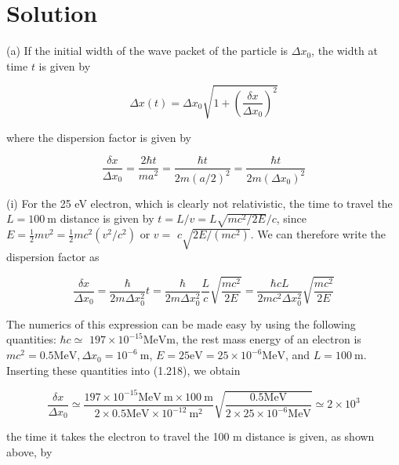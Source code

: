 \documentclass[10pt]{article}
\begin{document}
\section*{Solution}
(a) If the initial width of the wave packet of the particle is $\Delta x_{0}$, the width at time $t$ is given by


\begin{equation*}
\Delta x(t)=\Delta x_{0} \sqrt{1+\left(\frac{\delta x}{\Delta x_{0}}\right)^{2}} \tag{1.216}
\end{equation*}


where the dispersion factor is given by


\begin{equation*}
\frac{\delta x}{\Delta x_{0}}=\frac{2 \hbar t}{m a^{2}}=\frac{\hbar t}{2 m(a / 2)^{2}}=\frac{\hbar t}{2 m\left(\Delta x_{0}\right)^{2}} \tag{1.217}
\end{equation*}


(i) For the 25 eV electron, which is clearly not relativistic, the time to travel the $L=100 \mathrm{~m}$ distance is given by $t=L / v=L \sqrt{m c^{2} / 2 E} / c$, since $E=\frac{1}{2} m v^{2}=\frac{1}{2} m c^{2}\left(v^{2} / c^{2}\right)$ or $v=$ $c \sqrt{2 E /\left(m c^{2}\right)}$. We can therefore write the dispersion factor as


\begin{equation*}
\frac{\delta x}{\Delta x_{0}}=\frac{\hbar}{2 m \Delta x_{0}^{2}} t=\frac{\hbar}{2 m \Delta x_{0}^{2}} \frac{L}{c} \sqrt{\frac{m c^{2}}{2 E}}=\frac{\hbar c L}{2 m c^{2} \Delta x_{0}^{2}} \sqrt{\frac{m c^{2}}{2 E}} \tag{1.218}
\end{equation*}


The numerics of this expression can be made easy by using the following quantities: $\hbar c \simeq$ $197 \times 10^{-15} \mathrm{MeV} \mathrm{m}$, the rest mass energy of an electron is $m c^{2}=0.5 \mathrm{MeV}, \Delta x_{0}=10^{-6} \mathrm{~m}$, $E=25 \mathrm{eV}=25 \times 10^{-6} \mathrm{MeV}$, and $L=100 \mathrm{~m}$. Inserting these quantities into (1.218), we obtain


\begin{equation*}
\frac{\delta x}{\Delta x_{0}} \simeq \frac{197 \times 10^{-15} \mathrm{MeV} \mathrm{~m} \times 100 \mathrm{~m}}{2 \times 0.5 \mathrm{MeV} \times 10^{-12} \mathrm{~m}^{2}} \sqrt{\frac{0.5 \mathrm{MeV}}{2 \times 25 \times 10^{-6} \mathrm{MeV}}} \simeq 2 \times 10^{3} \tag{1.219}
\end{equation*}


the time it takes the electron to travel the 100 m distance is given, as shown above, by
\end{document}
